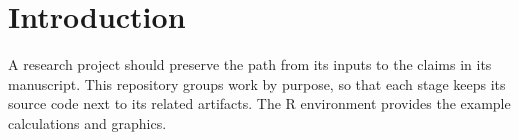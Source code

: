 \section{Introduction}
A research project should preserve the path from its inputs to the claims in its
manuscript. This repository groups work by purpose, so that each stage keeps its
source code next to its related artifacts. The R environment
\citep{RCoreTeam} provides the example calculations and graphics.
